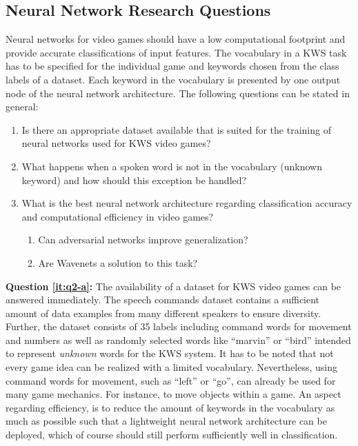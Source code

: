 \subsection{Neural Network Research Questions}\label{sec:intro_rq_nn}
Neural networks for video games should have a low computational footprint and provide accurate classifications of input features.
The vocabulary in a KWS task has to be specified for the individual game and keywords chosen from the class labels of a dataset.
Each keyword in the vocabulary is presented by one output node of the neural network architecture.
The following questions can be stated in general:
\begin{enumerate}[label={Q.2.\alph*)}, leftmargin=1.75cm]
  \item Is there an appropriate dataset available that is suited for the training of neural networks used for KWS video games?\label{it:q2-a}
  \item What happens when a spoken word is not in the vocabulary (unknown keyword) and how should this exception be handled?\label{it:q2-b}
  \item What is the best neural network architecture regarding classification accuracy and computational efficiency in video games?\label{it:q2-c}
  \begin{enumerate}[label=(\roman*)]
    \item Can adversarial networks improve generalization?
    \item Are Wavenets a solution to this task?
  \end{enumerate}
\end{enumerate}
\noindent
\textbf{Question \ref{it:q2-a}:} 
The availability of a dataset for KWS video games can be answered immediately. 
The speech commands dataset \cite{Warden2018} contains a sufficient amount of data examples from many different speakers to ensure diversity.
Further, the dataset consists of 35 labels including command words for movement and numbers as well as randomly selected words like \enquote{marvin} or \enquote{bird} intended to represent \emph{unknown} words for the KWS system.
It has to be noted that not every game idea can be realized with a limited vocabulary.
Nevertheless, using command words for movement, such as \enquote{left} or \enquote{go}, can already be used for many game mechanics.
For instance, to move objects within a game.
An aspect regarding efficiency, is to reduce the amount of keywords in the vocabulary as much as possible such that a lightweight neural network architecture can be deployed, which of course should still perform sufficiently well in classification.

